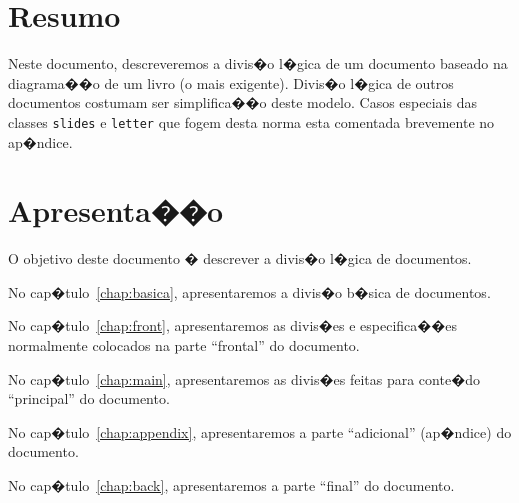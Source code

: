 \documentclass[12pt,a4paper,oneside, openany, titlepage]{book}
\begin{document}
\chapter*{Resumo}
Neste documento, descreveremos a divis�o l�gica de um documento baseado 
na diagrama��o de um livro (o mais exigente). 
Divis�o l�gica de outros documentos costumam ser simplifica��o deste modelo.
Casos especiais das classes \texttt{slides} e \texttt{letter} que fogem 
desta norma esta comentada brevemente no ap�ndice.
    
\tableofcontents %


\pagestyle{myheadings}

\chapter{Apresenta��o} %
O objetivo deste documento � descrever a divis�o l�gica de documentos.

 No cap�tulo~\ref{chap:basica}, apresentaremos a divis�o b�sica de documentos.

 No cap�tulo~\ref{chap:front}, apresentaremos as divis�es e especifica��es
 normalmente colocados na parte ``frontal'' do documento.

 No cap�tulo~\ref{chap:main}, apresentaremos as divis�es feitas para conte�do
 ``principal'' do documento.

 No cap�tulo~\ref{chap:appendix}, apresentaremos a parte ``adicional'' (ap�ndice) do documento.
 
 No cap�tulo~\ref{chap:back}, apresentaremos a parte ``final'' do documento.

%
\mainmatter 
\end{document}
